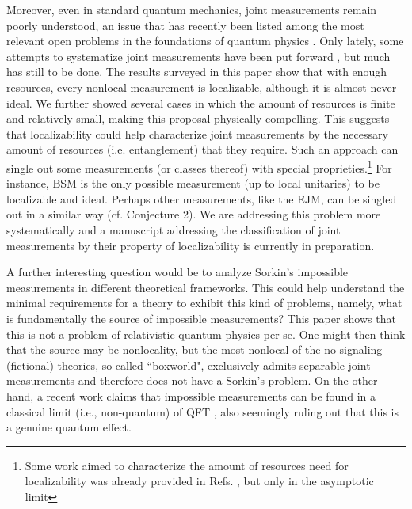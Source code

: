 \documentclass[12pt]{article}
\begin{document}
Moreover, even in standard quantum mechanics, joint measurements remain poorly understood, an issue that has recently been listed among the most relevant open problems in the foundations of quantum physics   \cite{cavalcanti2023fresh}. Only lately, some attempts to systematize joint measurements have been put forward \cite{chitambar2014everything, del2023iso}, but much has still to be done. The results surveyed in this paper show that with enough resources, every nonlocal measurement is localizable, although it is almost never ideal. We further showed several cases in which the amount of resources is finite and relatively small, making this proposal physically compelling. This suggests that localizability could help characterize joint measurements by the necessary amount of resources (i.e. entanglement) that they require. Such an approach can single out some measurements (or classes thereof) with special proprieties.\footnote{Some work aimed to characterize the amount of resources need for localizability was already provided in Refs. \cite{clark2010entanglement, groisman2015optimal}, but only in the asymptotic limit} For instance, BSM is the only possible measurement (up to local unitaries) to be localizable and ideal. Perhaps other measurements, like the EJM, can be singled out in a similar way (cf. Conjecture 2). We are addressing this problem more systematically and a manuscript addressing the classification of joint measurements by their property of localizability is currently in preparation.

A further interesting question would be to analyze Sorkin's impossible measurements in different theoretical frameworks. This could help understand the minimal requirements for a theory to exhibit this kind of problems, namely, what is fundamentally the source of impossible measurements? This paper shows that this is not a problem of relativistic quantum physics per se. One might then think that the source may be nonlocality, but the most nonlocal of the no-signaling (fictional) theories, so-called ``boxworld", exclusively admits separable joint measurements \cite{eftaxias2022joint} and therefore does not have a Sorkin's problem. 
On the other hand, a recent work claims that impossible measurements can be found in a classical limit (i.e., non-quantum) of QFT \cite{much2023superluminal}, also seemingly ruling out that this is a genuine quantum effect.
\end{document}
